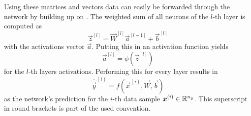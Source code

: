 Using these matrices and vectors data can easily be forwarded through the network by building up on .
The weighted sum of all neurons of the $l$-th layer is computed as
\begin{equation}
	\label{eq:weighted-sum}
	\vec{z}^{[l]} = \vec{W}^{[l]} \vec{a}^{[l-1]} + \vec{b}^{[l]}
\end{equation}
with the activations vector $\vec{a}$.
Putting this in an activation function yields
\begin{equation}
	\label{eq:activations}
	\vec{a}^{[l]} = \phi\left(\vec{z}^{[l]}\right)
\end{equation}
for the $l$-th layers activations.
Performing this for every layer results in 
\begin{equation}
	\label{eq:feedforward}
	\hat{\vec{y}}^{(i)} = f(\vec{x}^{(i)}, \vec{W}, \vec{b})
\end{equation}
as the network's prediction for the $i$-th data sample $\vec{x^}{(i)} \in \mathbb{R}^{n_y}$.
This superscript in round brackets is part of the used convention.

